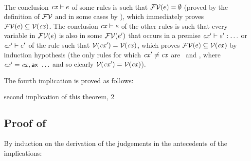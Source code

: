 \begin{bycase}
\Case{\Rthsub}
\begin{derivation}
\steP{\efvar{\app{\tspred}{\expr}}=\efvar{\tspred}\cup\efvar{\expr}}
\step{\hastyO{\expr}{\typ}}{\premof{\Rthsub}}
\end{derivation}

\Case{\restrules}\\
The conclusion $\mathit{cx}\vdash e$ of some rules is such that
$\mathcal{FV}(e)=\emptyset$ (proved by the definition of $\mathcal{FV}$ and in some
cases by ), which immediately proves
$\mathcal{FV}(e)\subseteq\mathcal{V}(\mathit{cx})$. The conclusion $\mathit{cx}\vdash e$ of the
other rules is such that every variable in $\mathcal{FV}(e)$ is also in some
$\mathcal{FV}(e')$ that occurs in a premise $\mathit{cx}'\vdash e':\ldots$ or
$\mathit{cx}'\vdash e'$ of the rule such that $\mathcal{V}(\mathit{cx}')=\mathcal{V}(\mathit{cx})$, which
proves $\mathcal{FV}(e)\subseteq\mathcal{V}(\mathit{cx})$ by induction hypothesis (the only rules
for which $\mathit{cx}'\neq\mathit{cx}$ are \Rthifsbs\ and \Rthif, where
$\mathit{cx}'=\mathit{cx},\mathsf{ax}\ \ldots$ and so clearly $\mathcal{V}(\mathit{cx}')=\mathcal{V}(\mathit{cx})$).

\end{bycase}

The fourth implication is proved as follows:
\begin{derivation}
     {second implication of this theorem, 2}
\end{derivation}


\subsection*{Proof of }

By induction on the derivation of the judgements in the antecedents of the
implications:

